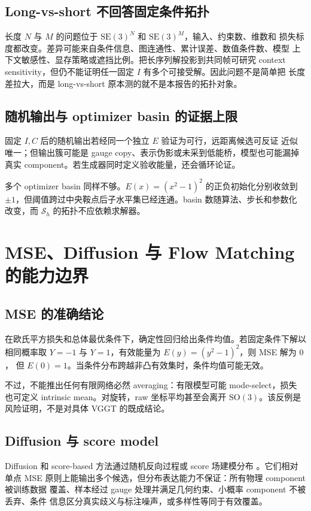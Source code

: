 \documentclass[UTF8,a4paper,11pt]{ctexart}
\newcommand{\SE}{\mathrm{SE}}
\newcommand{\SO}{\mathrm{SO}}
\newcommand{\Sset}{\mathcal S}
\begin{document}
\subsection{Long-vs-short 不回答固定条件拓扑}

长度 $N$ 与 $M$ 的问题位于 $\SE(3)^N$ 和 $\SE(3)^M$，输入、约束数、维数和
损失标度都改变。差异可能来自条件信息、图连通性、累计误差、数值条件数、模型
上下文敏感性、显存策略或遮挡比例。把长序列解投影到共同帧可研究 context
sensitivity，但仍不能证明任一固定 $I$ 有多个可接受解。因此问题不是简单把
长度差拉大，而是 long-vs-short 原本测的就不是本报告的拓扑对象。

\subsection{随机输出与 optimizer basin 的证据上限}

固定 $I,C$ 后的随机输出若经同一个独立 $E$ 验证为可行，远距离候选可反证
近似唯一；但输出簇可能是 gauge copy、表示伪影或未采到低能桥，模型也可能漏掉
真实 component。若生成器同时定义验收能量，还会循环论证。

多个 optimizer basin 同样不够。$E(x)=(x^2-1)^2$ 的正负初始化分别收敛到
$\pm1$，但阈值跨过中央鞍点后子水平集已经连通。basin 数随算法、步长和参数化
改变，而 $\Sset_h$ 的拓扑不应依赖求解器。

\section{MSE、Diffusion 与 Flow Matching 的能力边界}

\subsection{MSE 的准确结论}

在欧氏平方损失和总体最优条件下，确定性回归给出条件均值。若固定条件下解以
相同概率取 $Y=-1$ 与 $Y=1$，有效能量为 $E(y)=(y^2-1)^2$，则 MSE 解为 $0$，
但 $E(0)=1$。当条件分布跨越非凸有效集时，条件均值可能无效。

不过，不能推出任何有限网络必然 averaging：有限模型可能 mode-select，损失
也可定义 intrinsic mean。对旋转，raw 坐标平均甚至会离开 $\SO(3)$。该反例是
风险证明，不是对具体 VGGT 的既成结论。

\subsection{Diffusion 与 score model}

Diffusion 和 score-based 方法通过随机反向过程或 score 场建模分布
\citep{sohldickstein2015deep,ho2020denoising,song2021score}。它们相对单点 MSE
原则上能输出多个候选，但分布表达能力不保证：所有物理 component 被训练数据
覆盖、样本经过 gauge 处理并满足几何约束、小概率 component 不被丢弃、条件
信息区分真实歧义与标注噪声，或多样性等同于有效覆盖。
\end{document}
